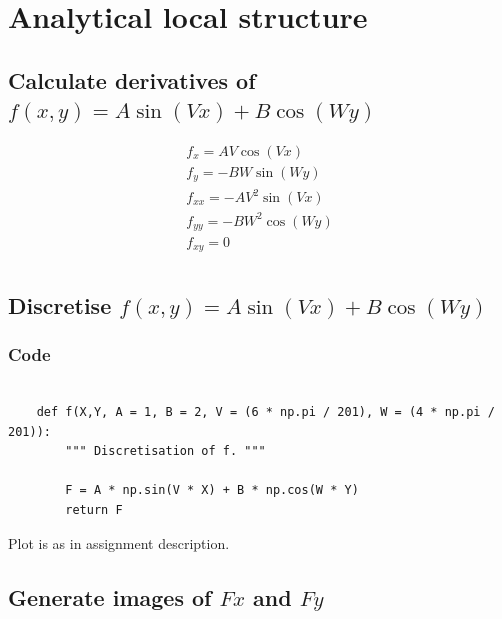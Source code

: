 \documentclass[abstract=true]{scrartcl}
\title{}
\author{Joris Stork, Lucas Swartsenburg}
\begin{document}
\maketitle


\section{Analytical local structure}

    \subsection{Calculate derivatives of $f(x,y)=A \sin(V x)+B \cos(W y)$}

        \begin{eqnarray}
            f_{x} = A V \cos(V x) \nonumber \\ 
            f_{y} = -B W \sin(W y) \nonumber \\
            f_{xx} = -A V^2 \sin(V x) \nonumber \\
            f_{yy} = -B W^2 \cos(W y) \nonumber \\
            f_{xy} = 0 \nonumber \\
        \end{eqnarray}

    \subsection{Discretise $f(x,y)=A \sin(V x)+B \cos(W y)$}

        \subsubsection{Code}
        \begin{verbatim}
        
    def f(X,Y, A = 1, B = 2, V = (6 * np.pi / 201), W = (4 * np.pi / 201)):
        """ Discretisation of f. """
        
        F = A * np.sin(V * X) + B * np.cos(W * Y)
        return F

        \end{verbatim}

        Plot is as in assignment description.

    \subsection{Generate images of $Fx$ and $Fy$}
\end{document}
